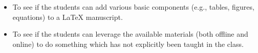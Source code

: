 \documentclass[16pt]{article}
\begin{document}
    \newpage
    \begin{itemize}
        \item To see if the students can add various basic components (e.g., tables, figures, equations) to a \LaTeX \hspace{1em} manuscript.
        \item To see if the students can leverage the available materials (both offline and online) to do something which has not explicitly been taught in the class.
    \end{itemize}
    
    
\end{document}

